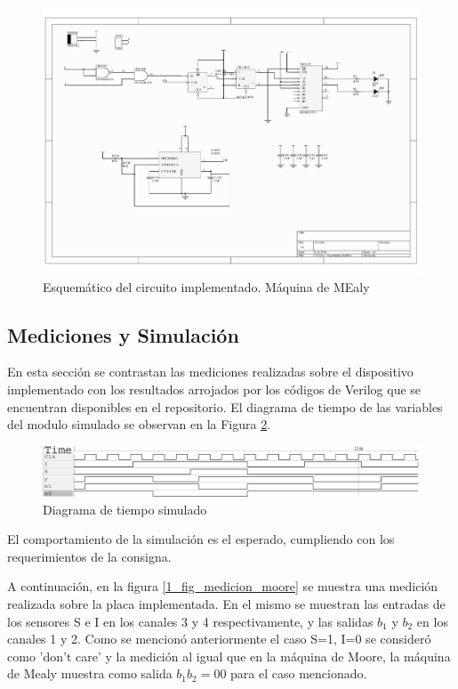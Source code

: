 \begin{figure}[ht]
\centering
\includegraphics[scale=0.6]{images/Esquematico_Mealy.pdf}
\caption{Esquemático del circuito implementado. Máquina de MEaly}
\label{1_fig_esqm_mealy}
\end{figure}

\subsection*{Mediciones y Simulación}

En esta sección se contrastan las mediciones realizadas sobre el dispositivo implementado con los resultados arrojados por los códigos de Verilog que se encuentran disponibles en el repositorio. El diagrama de tiempo de las variables del modulo simulado se observan en la Figura \ref{1_fig_verilog_mealy}.


\begin{figure}[H]
\centering
\includegraphics[scale=0.35]{images/time_diagram_mealy}
\caption{Diagrama de tiempo simulado}
\label{1_fig_verilog_mealy}
\end{figure}

El comportamiento de la simulación es el esperado, cumpliendo con los requerimientos de la consigna.

A continuación, en la figura \ref{1_fig_medicion_moore} se muestra una medición realizada sobre la placa implementada. En el mismo se muestran las entradas de los sensores S e I en los canales 3 y 4 respectivamente, y las salidas $b_1$ y $b_2$ en los canales 1 y 2. Como se mencionó anteriormente el caso S=1, I=0 se consideró como 'don't care' y la medición al igual que en la máquina de Moore, la máquina de Mealy muestra como salida $b_1b_2=00$ para el caso mencionado.

